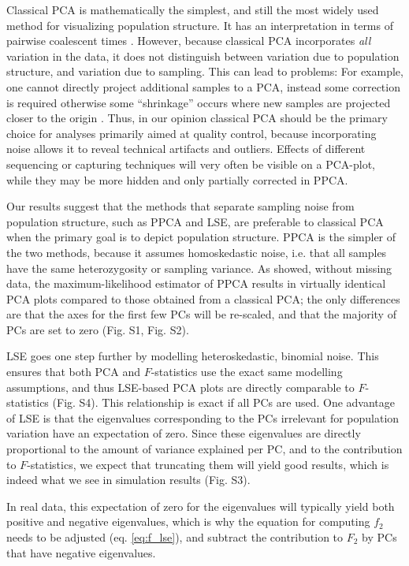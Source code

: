 \documentclass[12pt]{article}
\begin{document}
Classical PCA is mathematically the simplest, and still the most widely used method for visualizing population structure. It has an interpretation in terms of pairwise coalescent times \citep{mcvean_genealogical_2009}. However, because classical PCA incorporates \emph{all} variation in the data, it does not distinguish between variation due to population structure, and variation due to sampling. This can lead to problems: For example, one cannot directly project additional samples to a PCA, instead some correction is required otherwise some ``shrinkage'' occurs where new samples are projected closer to the origin \citep{patterson_population_2006, wang_improved_2015}. Thus, in our opinion classical PCA should be the primary choice for analyses primarily aimed at quality control, because incorporating noise allows it to reveal technical artifacts and outliers. Effects of different sequencing or capturing techniques will very often be visible on a PCA-plot, while they may be more hidden and only partially corrected in PPCA.

Our results suggest that the methods that separate sampling noise from population structure, such as PPCA and LSE, are preferable to classical PCA when the primary goal is to depict population structure. PPCA is the simpler of the two methods, because it assumes homoskedastic noise, i.e. that all samples have the same heterozygosity or sampling variance. As \cite{tipping_probabilistic_1999-1} showed, without missing data, the maximum-likelihood estimator of PPCA results in virtually identical PCA plots compared to those obtained from a classical PCA; the only differences are that the axes for the first few PCs will be re-scaled, and that the majority of PCs are set to zero (Fig. S1, Fig. S2).


LSE goes one step further by modelling heteroskedastic, binomial noise. This ensures that both PCA and $F$-statistics use the exact same modelling assumptions, and thus LSE-based PCA plots are directly comparable to $F$-statistics (Fig. S4). This relationship is exact if all PCs are used. One advantage of LSE is that the eigenvalues corresponding to the PCs irrelevant for population variation have an expectation of zero. Since these eigenvalues are directly proportional to the amount of variance explained per PC, and to the contribution to $F$-statistics, we expect that truncating them will yield good results, which is indeed what we see in simulation results (Fig. S3). 

In real data, this expectation of zero for the eigenvalues will typically yield both positive and negative eigenvalues, which is why the equation for computing $f_2$ needs to be adjusted (eq. \ref{eq:f_lse}), and subtract the contribution to $F_2$ by PCs that have negative eigenvalues.
\end{document}
